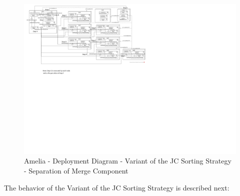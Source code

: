 \begin{landscape}
	\begin{figure}[p!]
		\centering
		\includegraphics[trim=6cm 45cm -6cm 2cm, scale=0.4]{fig/JCMunozMergerSeparated.pdf}
		\caption{Amelia - Deployment Diagram - Variant of the JC Sorting Strategy - Separation of Merge Component}
		\label{fig:diagramJCMunozMergerSeparated}
	\end{figure}
	
\end{landscape}

The behavior of the Variant of the JC Sorting Strategy is described next:

